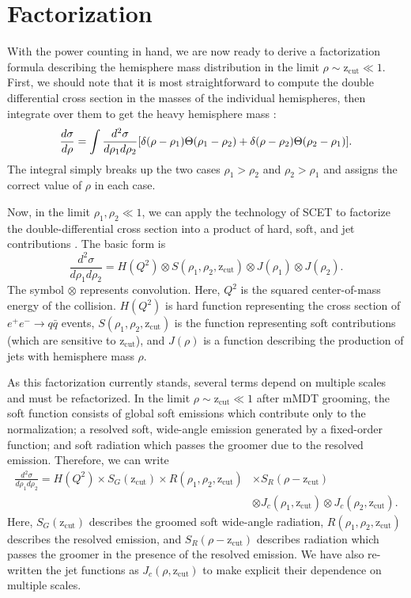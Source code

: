 \documentclass[12pt,twoside,class=../reedthesis, crop=false]{standalone}
\providecommand{\zcut}{\mathrm{z_{cut}}}
\begin{document}
\section{Factorization}
	With the power counting in hand, we are now ready to derive a factorization formula describing the hemisphere mass distribution in the limit $\rho \sim \zcut \ll 1$. First, we should note that it is most straightforward to compute the double differential cross section in the masses of the individual hemispheres, then integrate over them to get the heavy hemisphere mass \cite{chien_resummation_2010}:
	\begin{equation}\label{eq:heavy hemisphere cross section}
		\frac{d\sigma}{d\rho} = \int \frac{d^2\sigma}{d\rho_1d\rho_2}\qty[\delta(\rho - \rho_1)\Theta(\rho_1 - \rho_2) + \delta(\rho - \rho_2)\Theta(\rho_2 - \rho_1)].
	\end{equation}
	The integral simply breaks up the two cases $\rho_1 > \rho_2$ and $\rho_2 > \rho_1$ and assigns the correct value of $\rho$ in each case.

	Now, in the limit $\rho_1, \rho_2 \ll 1$, we can apply the technology of SCET to factorize the double-differential cross section into a product of hard, soft, and jet contributions \cite{frye_factorization_2016,ellis_jet_2010}. The basic form is
	\begin{equation}
		\frac{d^2\sigma}{d\rho_1 d\rho_2} = H(Q^2) \otimes S(\rho_1, \rho_2, \zcut) \otimes J(\rho_1) \otimes J(\rho_2).
	\end{equation}
	The symbol $\otimes$ represents convolution. Here, $Q^2$ is the squared center-of-mass energy of the collision. $H(Q^2)$ is hard function representing the cross section of $e^+ e^- \to q\bar{q}$ events, $S(\rho_1, \rho_2, \zcut)$ is the function representing soft contributions (which are sensitive to $\zcut$), and $J(\rho)$ is a function describing the production of jets with hemisphere mass $\rho$.

	As this factorization currently stands, several terms depend on multiple scales and must be refactorized. In the limit $\rho \sim \zcut \ll 1$ after mMDT grooming, the soft function consists of global soft emissions which contribute only to the normalization; a resolved soft, wide-angle emission generated by a fixed-order function; and soft radiation which passes the groomer due to the resolved emission. Therefore, we can write
	\begin{equation}
	\begin{aligned}
		\frac{d^2\sigma}{d\rho_1 d\rho_2} = H(Q^2) \times S_G(\zcut) \times R(\rho_1, \rho_2, \zcut) &\times S_R(\rho - \zcut) \\
			&\otimes J_c(\rho_1, \zcut) \otimes J_c(\rho_2, \zcut).
	\end{aligned}
	\end{equation}
	Here, $S_G(\zcut)$ describes the groomed soft wide-angle radiation, $R(\rho_1, \rho_2, \zcut)$ describes the resolved emission, and $S_R(\rho - \zcut)$ describes radiation which passes the groomer in the presence of the resolved emission. We have also re-written the jet functions as $J_c(\rho, \zcut)$ to make explicit their dependence on multiple scales.
\end{document}
